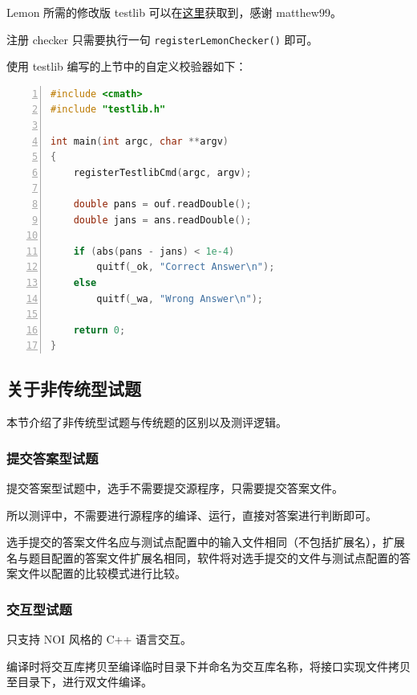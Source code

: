 \documentclass[12pt, a4paper]{article}
\begin{document}
Lemon 所需的修改版 testlib 可以在\href{https://paste.ubuntu.com/p/JsTspHHnmB/}{这里}获取到，感谢 matthew99。

注册 checker 只需要执行一句 \texttt{registerLemonChecker()} 即可。

使用 testlib 编写的上节中的自定义校验器如下：

\begin{lstlisting}[language={C++},numbers=left,frame=shadowbox,showspaces=false,showstringspaces=false
	rulesepcolor=\color{red!20!green!20!blue!20},
	keywordstyle=\color{blue!70!black},
	commentstyle=\color{blue!90!},
	basicstyle=\ttfamily]
#include <cmath>
#include "testlib.h"

int main(int argc, char **argv)
{
	registerTestlibCmd(argc, argv);

	double pans = ouf.readDouble();
	double jans = ans.readDouble();

	if (abs(pans - jans) < 1e-4)
		quitf(_ok, "Correct Answer\n");
	else
		quitf(_wa, "Wrong Answer\n");
	
	return 0;
}
\end{lstlisting}

\subsection{关于非传统型试题}

本节介绍了非传统型试题与传统题的区别以及测评逻辑。

\subsubsection{提交答案型试题}

提交答案型试题中，选手不需要提交源程序，只需要提交答案文件。

所以测评中，不需要进行源程序的编译、运行，直接对答案进行判断即可。

选手提交的答案文件名应与测试点配置中的输入文件相同（不包括扩展名），扩展名与题目配置的答案文件扩展名相同，软件将对选手提交的文件与测试点配置的答案文件以配置的比较模式进行比较。

\subsubsection{交互型试题}

只支持 NOI 风格的 C++ 语言交互。

编译时将交互库拷贝至编译临时目录下并命名为交互库名称，将接口实现文件拷贝至目录下，进行双文件编译。
\end{document}
